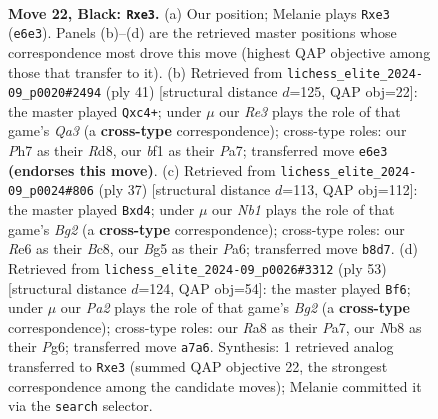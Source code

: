 \documentclass[11pt]{article}
\begin{document}
\clearpage

\begin{figure}[p]\centering
\begin{subfigure}{0.46\textwidth}\centering
\resizebox{\linewidth}{!}{%
\newchessgame
\chessboard[
  setfen={rnQ5/pp4kp/4r2p/1P1q2b1/3P2P1/4PP2/3KN3/R4B1R b - - 0 22},
  showmover=false,
  pgfstyle=straightmove, color=movearrow, markmove={e6-e3}
]}
\caption{}
\end{subfigure}\hfill
\begin{subfigure}{0.46\textwidth}\centering
\resizebox{\linewidth}{!}{%
\newchessgame
\chessboard[
  setfen={2kr4/pp1b4/q2p2Q1/2pP4/P1P2r2/2PK2N1/6PP/R4R2 b - - 1 21},
  showmover=false,
  pgfstyle=straightmove, color=movearrow, markmove={a6-c4}
]}
\caption{}
\end{subfigure}
\\[4pt]
\begin{subfigure}{0.46\textwidth}\centering
\resizebox{\linewidth}{!}{%
\newchessgame
\chessboard[
  setfen={r1b1k3/1pQnq1b1/p5Rp/8/3P3P/P3P3/1P3P2/R3KB2 b Qq - 0 19},
  showmover=false,
  pgfstyle=straightmove, color=movearrow, markmove={g7-d4}
]}
\caption{}
\end{subfigure}\hfill
\begin{subfigure}{0.46\textwidth}\centering
\resizebox{\linewidth}{!}{%
\newchessgame
\chessboard[
  setfen={3r2k1/p4pb1/3q2p1/2R2bQp/3p4/1P1P2PP/P4PBK/4R3 b - - 0 27},
  showmover=false,
  pgfstyle=straightmove, color=movearrow, markmove={g7-f6}
]}
\caption{}
\end{subfigure}
\caption{\textbf{Move 22, Black: \texttt{Rxe3}.} (a) Our position; Melanie plays \texttt{Rxe3} (\texttt{e6e3}). Panels (b)--(d) are the retrieved master positions whose correspondence most drove this move (highest QAP objective among those that transfer to it). (b) Retrieved from \texttt{lichess\_elite\_2024-09\_p0020\#2494} (ply 41) [structural distance $d$=125, QAP obj=22]: the master played \texttt{Qxc4+}; under $\mu$ our \emph{Re3} plays the role of that game's \emph{Qa3} (a \textbf{cross-type} correspondence); cross-type roles: our \emph{P}h7 as their \emph{R}d8, our \emph{b}f1 as their \emph{P}a7; transferred move \texttt{e6e3} \textbf{(endorses this move)}. (c) Retrieved from \texttt{lichess\_elite\_2024-09\_p0024\#806} (ply 37) [structural distance $d$=113, QAP obj=112]: the master played \texttt{Bxd4}; under $\mu$ our \emph{Nb1} plays the role of that game's \emph{Bg2} (a \textbf{cross-type} correspondence); cross-type roles: our \emph{R}e6 as their \emph{B}c8, our \emph{B}g5 as their \emph{P}a6; transferred move \texttt{b8d7}. (d) Retrieved from \texttt{lichess\_elite\_2024-09\_p0026\#3312} (ply 53) [structural distance $d$=124, QAP obj=54]: the master played \texttt{Bf6}; under $\mu$ our \emph{Pa2} plays the role of that game's \emph{Bg2} (a \textbf{cross-type} correspondence); cross-type roles: our \emph{R}a8 as their \emph{P}a7, our \emph{N}b8 as their \emph{P}g6; transferred move \texttt{a7a6}. Synthesis: 1 retrieved analog transferred to \texttt{Rxe3} (summed QAP objective 22, the strongest correspondence among the candidate moves); Melanie committed it via the \texttt{search} selector.}
\label{fig:thought-m43}
\end{figure}
\end{document}
